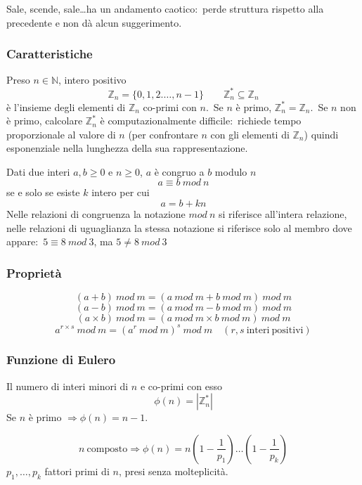 \noindent Sale, scende, sale\dots ha un andamento caotico:\ perde struttura rispetto alla precedente e non dà alcun suggerimento.\

\subsubsection{Caratteristiche}

Preso $n \in \mathbb{N}$, intero positivo
\[\mathbb{Z}_n = \{0,1,2.\dots, n-1\}\qquad \mathbb{Z}_n^* \subseteq \mathbb{Z}_n\]
è l'insieme degli elementi di $\mathbb{Z}_n$ co-primi con $n$.\
Se $n$ è primo, $\mathbb{Z}_n^* = \mathbb{Z}_n$.\
Se $n$ non è primo, calcolare $\mathbb{Z}_n^*$ è computazionalmente difficile:\ richiede tempo proporzionale al valore di $n$ (per confrontare $n$ con gli elementi di $\mathbb{Z}_n$) quindi esponenziale nella lunghezza della sua rappresentazione.\

\vspace{12pt}
\noindent Dati due interi $a,b \geq 0$ e $n\geq0$, $a$ è congruo a $b$ modulo $n$
\[a \equiv b\ \mathit{mod}\ n\]
se e solo se esiste $k$ intero per cui
\[a = b + kn\]
Nelle relazioni di congruenza la notazione $\mathit{mod}\ n$ si riferisce all'intera relazione, nelle relazioni di uguaglianza la stessa notazione si riferisce solo al membro dove appare:\ $5\equiv 8\ \mathit{mod}\ 3$, ma $5\neq 8\ \mathit{mod}\ 3$

\subsubsection{Proprietà}

\[(a+b)\ \mathit{mod}\ m = (a\ \mathit{mod}\ m + b\ \mathit{mod}\ m)\ \mathit{mod}\ m\]
\[(a-b)\ \mathit{mod}\ m = (a\ \mathit{mod}\ m - b\ \mathit{mod}\ m)\ \mathit{mod}\ m\]
\[(a\times b)\ \mathit{mod}\ m = (a\ \mathit{mod}\ m \times b\ \mathit{mod}\ m)\ \mathit{mod}\ m\]
\[a^{r \times s}\ \mathit{mod}\ m = (a^r\ \mathit{mod}\ m)^s\ \mathit{mod}\ m\quad (r, s\ \mathrm{interi\ positivi})\]

\subsubsection{Funzione di Eulero}

Il numero di interi minori di $n$ e co-primi con esso
\[\phi(n) = |\mathbb{Z}_n^*|\]
Se $n$ è primo $\Rightarrow \phi (n) = n-1$.\

\begin{theorem}

    \[n\ \mathrm{composto} \Rightarrow \phi(n) = n\left(1-\frac{1}{p_1}\right)\dots \left(1-\frac{1}{p_k}\right)\]
    $p_1, \dots, p_k$ fattori primi di $n$, presi senza molteplicità.\
\end{theorem}

